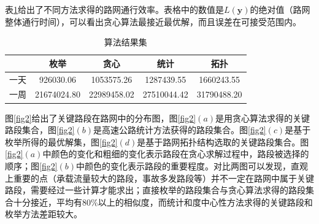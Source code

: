 				表\ref{tab:5}给出了不同方法求得的路网通行效率。表格中的数值是$L(\bm{y})$的绝对值（路网整体通行时间），可以看出贪心算法最接近最优解，而且误差在可接受范围内。

				\begin{table}[h]
				\centering
				\begin{tabular}{|c|c|c|c|c|}
				\hline
				\hline
				   &   枚举 &   贪心 &   统计 &   拓扑 \\
				\hline
				  一天 &  926030.06 & 1053575.26 & 1287439.55 & 1660243.55 \\
				\hline
				  一周 &  21674024.80 & 22989458.02 & 27510044.42 & 31790488.20 \\
				\hline
				\end{tabular}
				\caption{算法结果集}
				\label{tab:5}
				\end{table} 



				图\ref{fig2}给出了关键路段在路网中的分布图，图\ref{fig2}$(a)$是用贪心算法求得的关键路段集合，图\ref{fig2}$(b)$是高速公路统计方法获得的路段集合。图\ref{fig2}$(c)$是基于枚举所得的最优解集，图\ref{fig2}$(d)$是基于路网拓扑结构选取的关键路段集合。图\ref{fig2}$(a)$中颜色的变化和粗细的变化表示路段在贪心求解过程中，路段被选择的顺序；图\ref{fig2}$(b)$中颜色的变化表示路段的重要程度。对比两图可以发现，直观上重要的点（承载流量较大的路段，事故多发路段等）并不一定在路网中属于关键路段，需要经过一些计算才能求出；直接枚举的路段集合与贪心算法求得的路段集合十分接近，平均有80\%以上的相似度，而统计和度中心性方法求得的关键路段和枚举方法差距较大。

